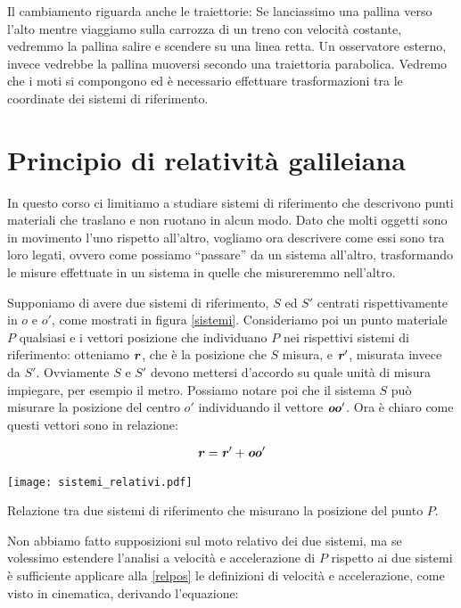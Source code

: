 Il cambiamento riguarda anche le traiettorie: Se lanciassimo una pallina
verso l'alto mentre viaggiamo sulla carrozza di un treno con velocità
costante, vedremmo la pallina salire e scendere su una linea retta.
Un osservatore esterno, invece vedrebbe la pallina muoversi secondo
una traiettoria parabolica. Vedremo che i moti si compongono
ed è necessario effettuare trasformazioni tra le coordinate dei
sistemi di riferimento.


\section{Principio di relatività galileiana}
In questo corso ci limitiamo a studiare sistemi di riferimento che
descrivono punti materiali che traslano e non ruotano in
alcun modo. Dato che molti oggetti sono in movimento l'uno rispetto
all'altro, vogliamo ora descrivere come essi sono tra loro legati,
ovvero come possiamo ``passare'' da un sistema all'altro, trasformando
le misure effettuate in un sistema in quelle che misureremmo nell'altro.

Supponiamo di avere due sistemi di riferimento, $S$ ed $S'$
centrati rispettivamente in $o$ e $o'$, come mostrati in figura
\ref{sistemi}. Consideriamo poi un punto materiale $P$ qualsiasi
e i vettori posizione che individuano $P$ nei rispettivi sistemi di riferimento:
otteniamo $\textbf{\textit{r}}$, che è la posizione che $S$ misura,
e $\textbf{\textit{r}}'$, misurata invece da $S'$. Ovviamente $S$ e $S'$
devono mettersi d'accordo su quale unità di misura impiegare, per
esempio il metro. Possiamo notare poi che il
sistema $S$ può misurare la posizione del centro $o'$ individuando
il vettore $\textbf{\textit{oo}}'$. Ora è chiaro come questi vettori sono
in relazione:

\begin{align}
    \textbf{\textit{r}} = \textbf{\textit{r}}' + \textbf{\textit{oo}}'\label{relpos}
\end{align}


\begin{marginfigure}
    \centering
    \texttt{[image: sistemi\_relativi.pdf]}
    \caption{Relazione tra due sistemi di riferimento che misurano
    la posizione del punto $P$.}
    \label{sistemi}
\end{marginfigure}

\noindent Non abbiamo fatto supposizioni sul moto relativo dei
due sistemi, ma se volessimo estendere l'analisi a velocità e
accelerazione di $P$ rispetto ai due sistemi è sufficiente
applicare alla \ref{relpos} le definizioni di velocità e accelerazione,
come visto in cinematica, derivando l'equazione:

